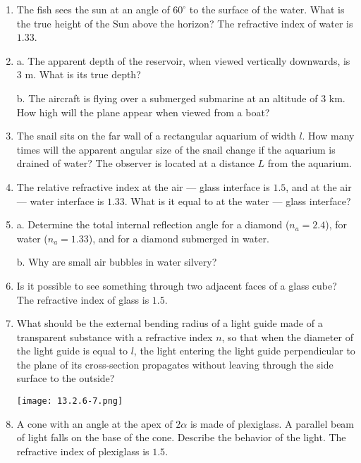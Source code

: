 \documentclass{article}
\begin{document}
\begin{enumerate}[label=13.2.\arabic*]

\item  The fish sees the sun at an angle of $60^\circ$ to the surface of the water. What is the true height of the Sun above the horizon? The refractive index of water is $1.33$.

\item a. The apparent depth of the reservoir, when viewed vertically downwards, is $3$ m. What is its true depth? 

b. The aircraft is flying over a submerged submarine at an altitude of $3$ km. How high will the plane appear when viewed from a boat?

\item  The snail sits on the far wall of a rectangular aquarium of width $l$. How many times will the apparent angular size of the snail change if the aquarium is drained of water? The observer is located at a distance $L$ from the aquarium.

\item  The relative refractive index at the air — glass interface is $1.5$, and at the air — water interface is $1.33$. What is it equal to at the water — glass interface?

\item  a. Determine the total internal reflection angle for a diamond ($n_a = 2.4$), for water ($n_a = 1.33$), and for a diamond submerged in water.

b. Why are small air bubbles in water silvery?

\item  Is it possible to see something through two adjacent faces of a glass cube? The refractive index of glass is $1.5$.

\item  What should be the external bending radius of a light guide made of a transparent substance with a refractive index $n$, so that when the diameter of the light guide is equal to $l$, the light entering the light guide perpendicular to the plane of its cross-section propagates without leaving through the side surface to the outside?

\begin{center}
    \texttt{[image: 13.2.6-7.png]}
\end{center}

\item  A cone with an angle at the apex of $2 \alpha$ is made of plexiglass. A parallel beam of light falls on the base of the cone. Describe the behavior of the light. The refractive index of plexiglass is $1.5$.


\end{enumerate}
\end{document}
